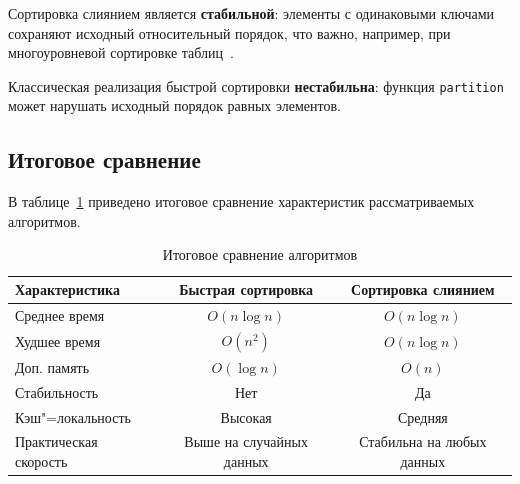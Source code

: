 Сортировка слиянием является \textbf{стабильной}: элементы с одинаковыми
ключами сохраняют исходный относительный порядок, что важно, например,
при многоуровневой сортировке таблиц~\cite{merge_analysis}.

Классическая реализация быстрой сортировки \textbf{нестабильна}:
функция \texttt{partition} может нарушать исходный порядок
равных элементов.

\subsection{Итоговое сравнение}

В таблице~\ref{tab:summary} приведено итоговое сравнение характеристик
рассматриваемых алгоритмов.

\begin{table}[H]
    \caption{Итоговое сравнение алгоритмов}
    \label{tab:summary}
    \begin{tabular}{|l|c|c|}
        \hline
        \textbf{Характеристика}    & \textbf{Быстрая сортировка} & \textbf{Сортировка слиянием} \\
        \hline
        Среднее время              & $O(n \log n)$               & $O(n \log n)$                \\
        \hline
        Худшее время               & $O(n^2)$                    & $O(n \log n)$                \\
        \hline
        Доп. память                & $O(\log n)$                 & $O(n)$                       \\
        \hline
        Стабильность               & Нет                         & Да                           \\
        \hline
        Кэш"=локальность           & Высокая                     & Средняя                      \\
        \hline
        Практическая скорость      & Выше на случайных данных    & Стабильна на любых данных    \\
        \hline
    \end{tabular}
\end{table}
